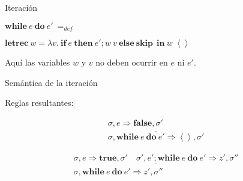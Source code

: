 \documentclass{beamer}
\newcommand{\s}{\sigma }
\newcommand{\la}{\left\langle }
\newcommand{\ra}{\right\rangle }
\newcommand{\ife}{\mathbf{if}\ }
\newcommand{\ine}{\ \mathbf{in}\ }
\newcommand{\thene}{\ \mathbf{then}\ }
\newcommand{\elsee}{\ \mathbf{else}\ }
\newcommand{\while}{\mathbf{while}\ }
\newcommand{\doc}{\ \mathbf{do}\ }
\begin{document}
\begin{frame}{Iteración}

$
\while e\doc e'\ =_{def}\ $

\bigskip

$\textbf{letrec}\ w=\lambda v.\ \ife e\thene e';w\ v\elsee \textbf{skip}\ \ine w\; \la\ra
$

\bigskip

Aquí las variables $w$ y $v$ no deben ocurrir en $e$ ni $e'$. 

\end{frame}


\begin{frame}{Semántica de la iteración}


Reglas resultantes:

\[\begin{array}{c}
\s,e \Rightarrow \textbf{false},\s'\\
\overline{\s,\while e\doc e' \Rightarrow \la\ra,\s'}
\end{array}
\]
\pause
\bigskip

\[
\begin{array}{c}
\underline{\s,e \Rightarrow \textbf{true},\s'\quad \s',e';\while e \doc e' \Rightarrow z',\s''}\\
\s,\while e \doc e' \Rightarrow z',\s''
\end{array}
\]

\end{frame}
\end{document}
